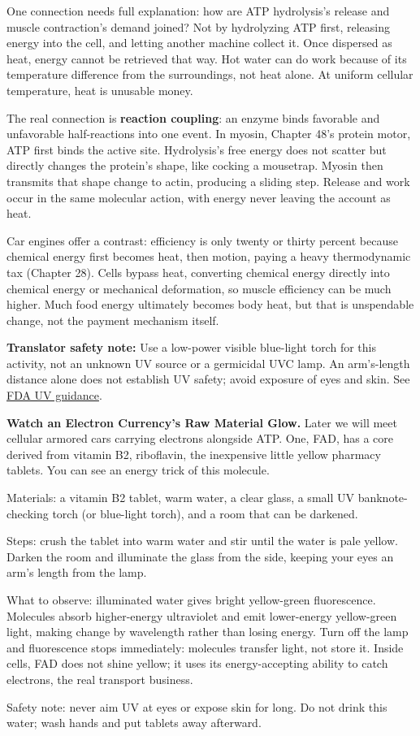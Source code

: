 One connection needs full explanation: how are ATP hydrolysis's release and muscle contraction's demand joined? Not by hydrolyzing ATP first, releasing energy into the cell, and letting another machine collect it. Once dispersed as heat, energy cannot be retrieved that way. Hot water can do work because of its temperature difference from the surroundings, not heat alone. At uniform cellular temperature, heat is unusable money.

The real connection is \textbf{reaction coupling}: an enzyme binds favorable and unfavorable half-reactions into one event. In myosin, Chapter 48's protein motor, ATP first binds the active site. Hydrolysis's free energy does not scatter but directly changes the protein's shape, like cocking a mousetrap. Myosin then transmits that shape change to actin, producing a sliding step. Release and work occur in the same molecular action, with energy never leaving the account as heat.

Car engines offer a contrast: efficiency is only twenty or thirty percent because chemical energy first becomes heat, then motion, paying a heavy thermodynamic tax (Chapter 28). Cells bypass heat, converting chemical energy directly into chemical energy or mechanical deformation, so muscle efficiency can be much higher. Much food energy ultimately becomes body heat, but that is unspendable change, not the payment mechanism itself.

\textbf{Translator safety note:} Use a low-power visible blue-light torch for this activity, not an unknown UV source or a germicidal UVC lamp. An arm's-length distance alone does not establish UV safety; avoid exposure of eyes and skin. See \href{https://www.fda.gov/radiation-emitting-products/tanning/ultraviolet-uv-radiation}{FDA UV guidance}.

\begin{shiyan}
\textbf{Watch an Electron Currency's Raw Material Glow.} Later we will meet cellular armored cars carrying electrons alongside ATP. One, FAD, has a core derived from vitamin B2, riboflavin, the inexpensive little yellow pharmacy tablets. You can see an energy trick of this molecule.

Materials: a vitamin B2 tablet, warm water, a clear glass, a small UV banknote-checking torch (or blue-light torch), and a room that can be darkened.

Steps: crush the tablet into warm water and stir until the water is pale yellow. Darken the room and illuminate the glass from the side, keeping your eyes an arm's length from the lamp.

What to observe: illuminated water gives bright yellow-green fluorescence. Molecules absorb higher-energy ultraviolet and emit lower-energy yellow-green light, making change by wavelength rather than losing energy. Turn off the lamp and fluorescence stops immediately: molecules transfer light, not store it. Inside cells, FAD does not shine yellow; it uses its energy-accepting ability to catch electrons, the real transport business.

Safety note: never aim UV at eyes or expose skin for long. Do not drink this water; wash hands and put tablets away afterward.
\end{shiyan}


